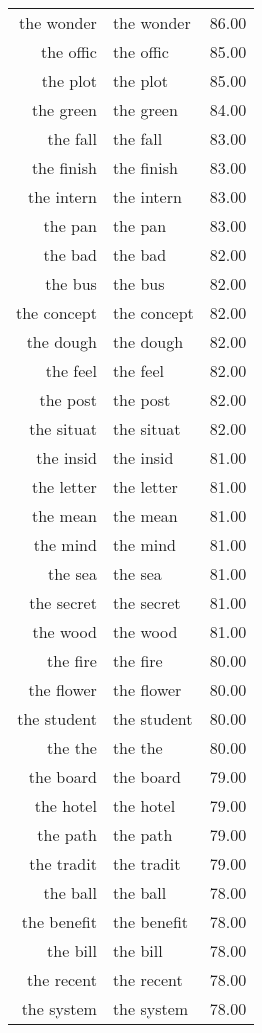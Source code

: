 \begin{table}[ht]
\begin{tabular}{rlr}
  the wonder & the wonder & 86.00 \\ 
  the offic & the offic & 85.00 \\ 
  the plot & the plot & 85.00 \\ 
  the green & the green & 84.00 \\ 
  the fall & the fall & 83.00 \\ 
  the finish & the finish & 83.00 \\ 
  the intern & the intern & 83.00 \\ 
  the pan & the pan & 83.00 \\ 
  the bad & the bad & 82.00 \\ 
  the bus & the bus & 82.00 \\ 
  the concept & the concept & 82.00 \\ 
  the dough & the dough & 82.00 \\ 
  the feel & the feel & 82.00 \\ 
  the post & the post & 82.00 \\ 
  the situat & the situat & 82.00 \\ 
  the insid & the insid & 81.00 \\ 
  the letter & the letter & 81.00 \\ 
  the mean & the mean & 81.00 \\ 
  the mind & the mind & 81.00 \\ 
  the sea & the sea & 81.00 \\ 
  the secret & the secret & 81.00 \\ 
  the wood & the wood & 81.00 \\ 
  the fire & the fire & 80.00 \\ 
  the flower & the flower & 80.00 \\ 
  the student & the student & 80.00 \\ 
  the the & the the & 80.00 \\ 
  the board & the board & 79.00 \\ 
  the hotel & the hotel & 79.00 \\ 
  the path & the path & 79.00 \\ 
  the tradit & the tradit & 79.00 \\ 
  the ball & the ball & 78.00 \\ 
  the benefit & the benefit & 78.00 \\ 
  the bill & the bill & 78.00 \\ 
  the recent & the recent & 78.00 \\ 
  the system & the system & 78.00 \\ 

\end{tabular}
\end{table}
